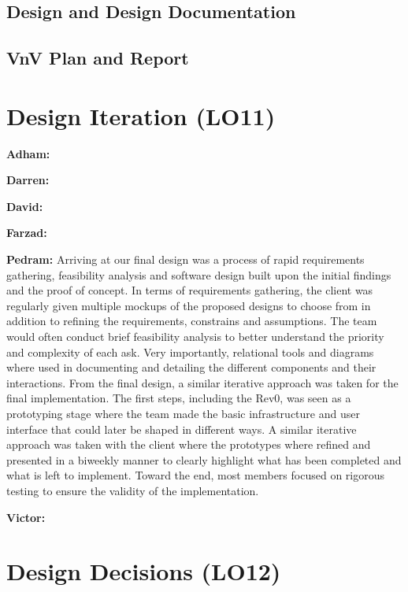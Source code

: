 \documentclass{article}
\begin{document}
\subsection{Design and Design Documentation}

\subsection{VnV Plan and Report}

\section{Design Iteration (LO11)}


\textbf{Adham:}

\textbf{Darren:}

\textbf{David:}

\textbf{Farzad:}

\textbf{Pedram:} Arriving at our final design was a process of rapid requirements gathering, feasibility analysis and software design built upon the initial findings and the proof of concept. In terms of requirements gathering, the client was regularly given multiple mockups of the proposed designs to choose from in addition to refining the requirements, constrains and assumptions. The team would often conduct brief feasibility analysis to better understand the priority and complexity of each ask. Very importantly, relational tools and diagrams where used in documenting and detailing the different components and their interactions.  From the final design, a similar iterative approach was taken for the final implementation. The first steps, including the Rev0, was seen as a prototyping stage where the team made the basic infrastructure and user interface that could later be shaped in different ways. A similar iterative approach was taken with the client where the prototypes where refined and presented in a biweekly manner to clearly highlight what has been completed and what is left to implement. Toward the end, most members focused on rigorous testing to ensure the validity of the implementation. 

\textbf{Victor:} 

\section{Design Decisions (LO12)}
\end{document}
